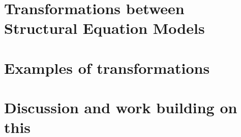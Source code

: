 \section{Transformations between Structural Equation Models}
\section{Examples of transformations}
\section{Discussion and work building on this}











































